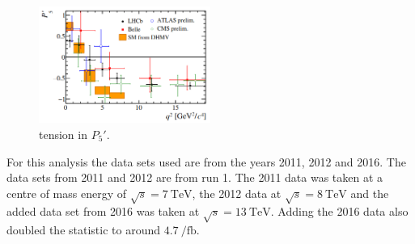 \begin{figure}[htb]
  \centering
  \includegraphics[width=0.5\textwidth]{flavor_plots/tension_in_p5.png}
  \caption{tension in $P_5\prime$.\cite{Blake:2017wjz}}
  \label{fig:p5tension}
\end{figure}

For this analysis the data sets used are from the years 2011, 2012 and 2016. The data sets from 2011 and 2012 are from run 1.
The 2011 data was taken at a centre of mass energy of $\sqrt{s} = \SI{7}{\tera\electronvolt}$, the 2012 data at $\sqrt{s} = \SI{8}{\tera\electronvolt}$ and the added data set from 2016 was taken at $\sqrt{s} = \SI{13}{\tera\electronvolt}$. Adding the 2016 data also doubled the statistic to around $\SI{4.7}{\per\femto\barn}$.

